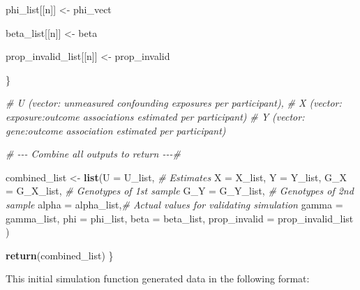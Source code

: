 \documentclass[
]{article}
\newenvironment{Shaded}{\begin{snugshade}}{\end{snugshade}}
\newcommand{\AttributeTok}[1]{\textcolor[rgb]{0.13,0.29,0.53}{#1}}
\newcommand{\CommentTok}[1]{\textcolor[rgb]{0.56,0.35,0.01}{\textit{#1}}}
\newcommand{\FunctionTok}[1]{\textcolor[rgb]{0.13,0.29,0.53}{\textbf{#1}}}
\newcommand{\NormalTok}[1]{#1}
\newcommand{\OtherTok}[1]{\textcolor[rgb]{0.56,0.35,0.01}{#1}}
\begin{document}
\begin{Shaded}
\begin{Highlighting}[]
\NormalTok{     phi\_list[[n]] }\OtherTok{\textless{}{-}}\NormalTok{ phi\_vect}

\NormalTok{     beta\_list[[n]] }\OtherTok{\textless{}{-}}\NormalTok{ beta}

\NormalTok{     prop\_invalid\_list[[n]] }\OtherTok{\textless{}{-}}\NormalTok{ prop\_invalid}


\NormalTok{   \}}

  \CommentTok{\#     U (vector: unmeasured confounding exposures per participant),}
  \CommentTok{\#     X (vector: exposure:outcome associations estimated per participant)}
  \CommentTok{\#     Y (vector: gene:outcome association estimated per participant)}


  \CommentTok{\# {-}{-}{-} Combine all outputs to return {-}{-}{-}\#}

\NormalTok{   combined\_list }\OtherTok{\textless{}{-}} \FunctionTok{list}\NormalTok{(}\AttributeTok{U =}\NormalTok{ U\_list,        }\CommentTok{\# Estimates}
                         \AttributeTok{X =}\NormalTok{ X\_list,}
                         \AttributeTok{Y =}\NormalTok{ Y\_list,}
                         \AttributeTok{G\_X =}\NormalTok{ G\_X\_list,    }\CommentTok{\# Genotypes of 1st sample}
                         \AttributeTok{G\_Y =}\NormalTok{ G\_Y\_list,    }\CommentTok{\# Genotypes of 2nd sample}
                         \AttributeTok{alpha =}\NormalTok{ alpha\_list,}\CommentTok{\# Actual values for validating simulation}
                         \AttributeTok{gamma =}\NormalTok{ gamma\_list,}
                         \AttributeTok{phi =}\NormalTok{ phi\_list,}
                         \AttributeTok{beta =}\NormalTok{ beta\_list,}
                         \AttributeTok{prop\_invalid =}\NormalTok{ prop\_invalid\_list}
\NormalTok{   )}

   \FunctionTok{return}\NormalTok{(combined\_list)}
\NormalTok{ \}}
\end{Highlighting}
\end{Shaded}

This initial simulation function generated data in the following format:
\end{document}

